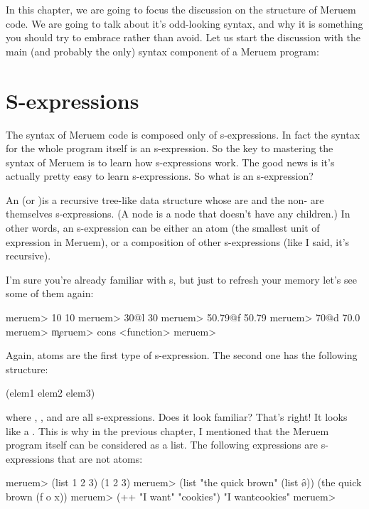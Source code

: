 In this chapter, we are going to focus the discussion on the structure of Meruem code. We are going to talk about it's odd-looking syntax, and why it is something you should try to embrace rather than avoid. Let us start the discussion with the main (and probably the only) syntax component of a Meruem program: 

\section{S-expressions}
The syntax of Meruem code is composed only of s-expressions. In fact the syntax for the whole program itself is an s-expression. So the key to mastering the syntax of Meruem is to learn how s-expressions work. The good news is it's actually pretty easy to learn s-expressions. So what is an s-expression?

An  (or )is a recursive tree-like data structure whose  are  and the non- are themselves s-expressions. 
(A  node is a node that doesn't have any children.) In other words, an s-expression can be either an atom (the smallest unit of expression in Meruem), or a composition of other s-expressions (like I said, it's recursive). 

I'm sure you're already familiar with s, but just to refresh your memory let's see some of them again:

\begin{REPL}
meruem> 10            
10
meruem> 30@l
30
meruem> 50.79@f
50.79
meruem> 70@d
70.0
meruem> \c
\c
meruem> cons
<function>
meruem>   
\end{REPL}

Again, atoms are the first type of s-expression. The second one has the following structure: 

\begin{QuasiLang}
(elem1 elem2 elem3)
\end{QuasiLang}

where , , and  are all s-expressions. Does it look familiar? That's right! It looks like a . This is why in the previous chapter, I mentioned that the Meruem program itself can be considered as a list. The following expressions are s-expressions that are not atoms:

\begin{REPL}
meruem> (list 1 2 3)
(1 2 3)
meruem> (list "the quick brown" (list \f \o \x))
(the quick brown (f o x))
meruem> (++ "I want" "cookies")
"I wantcookies"
meruem> 
\end{REPL}

